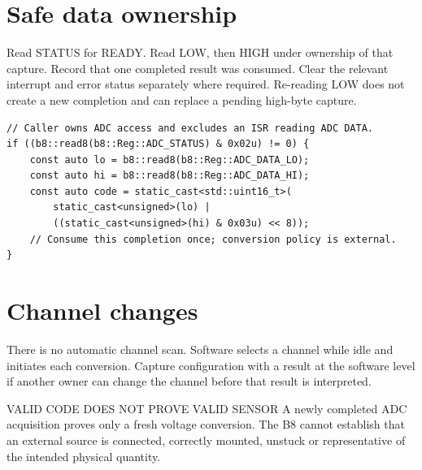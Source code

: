 \documentclass[10pt]{article}
\begin{document}
\section*{Safe data ownership}
Read STATUS for READY. Read LOW, then HIGH under ownership of that capture. Record that one completed result was consumed. Clear the relevant interrupt and error status separately where required. Re-reading LOW does not create a new completion and can replace a pending high-byte capture.
\begin{verbatim}
// Caller owns ADC access and excludes an ISR reading ADC DATA.
if ((b8::read8(b8::Reg::ADC_STATUS) & 0x02u) != 0) {
    const auto lo = b8::read8(b8::Reg::ADC_DATA_LO);
    const auto hi = b8::read8(b8::Reg::ADC_DATA_HI);
    const auto code = static_cast<std::uint16_t>(
        static_cast<unsigned>(lo) |
        ((static_cast<unsigned>(hi) & 0x03u) << 8));
    // Consume this completion once; conversion policy is external.
}
\end{verbatim}
\section*{Channel changes}
There is no automatic channel scan. Software selects a channel while idle and initiates each conversion. Capture configuration with a result at the software level if another owner can change the channel before that result is interpreted.
\begin{Notice}{VALID CODE DOES NOT PROVE VALID SENSOR}
A newly completed ADC acquisition proves only a fresh voltage conversion. The B8 cannot establish that an external source is connected, correctly mounted, unstuck or representative of the intended physical quantity.
\end{Notice}

\newpage
{}
\end{document}
